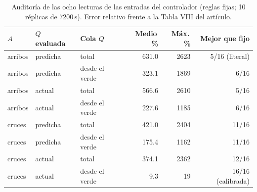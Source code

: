 \begin{table}[!t]
\caption{Auditoría de las ocho lecturas de las entradas del controlador (reglas fijas; 10 réplicas de 7200\,s). Error relativo frente a la Tabla VIII del artículo.}
\label{tab:auditoria}
\centering
\scriptsize
\setlength{\tabcolsep}{2.4pt}
\begin{tabular}{@{}lllrrr@{}}
\toprule
$A$ & $Q$ evaluada & Cola $Q$ & Medio\,\% & Máx.\,\% & Mejor que fijo \\
\midrule
arribos & predicha & total & 631.0 & 2623 & 5/16 (literal) \\
arribos & predicha & desde el verde & 323.1 & 1869 & 6/16 \\
arribos & actual & total & 566.6 & 2610 & 5/16 \\
arribos & actual & desde el verde & 227.6 & 1185 & 6/16 \\
cruces & predicha & total & 421.0 & 2404 & 11/16 \\
cruces & predicha & desde el verde & 175.4 & 1162 & 11/16 \\
cruces & actual & total & 374.1 & 2362 & 12/16 \\
cruces & actual & desde el verde & 9.3 & 19 & 16/16 (calibrada) \\
\bottomrule
\end{tabular}
\end{table}
